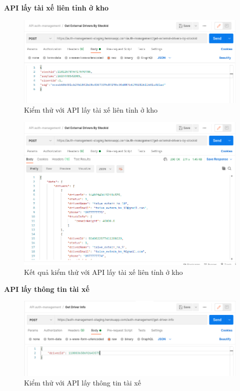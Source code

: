 		\newpage
		\textbf{API lấy tài xế liên tỉnh ở kho}
		
		\begin{figure}[H]
			\includegraphics[width=1\textwidth]{Images/testing/API-get-driver-external-warehouse.png}
			\centering
			\linebreak
			\caption{Kiểm thử với API lấy tài xế liên tỉnh ở kho}
		\end{figure}
		
		\begin{figure}[H]
			\includegraphics[width=1\textwidth]{Images/testing/API-get-driver-external-warehouse-result.png}
			\centering
			\linebreak
			\caption{Kết quả kiểm thử với API lấy tài xế liên tỉnh ở kho}
		\end{figure}
		
		\newpage
		\textbf{API lấy thông tin tài xế}
		
		\begin{figure}[H]
			\includegraphics[width=1\textwidth]{Images/testing/API-get-driver-info.png}
			\centering
			\linebreak
			\caption{Kiểm thử với API lấy thông tin tài xế}
		\end{figure}
		
